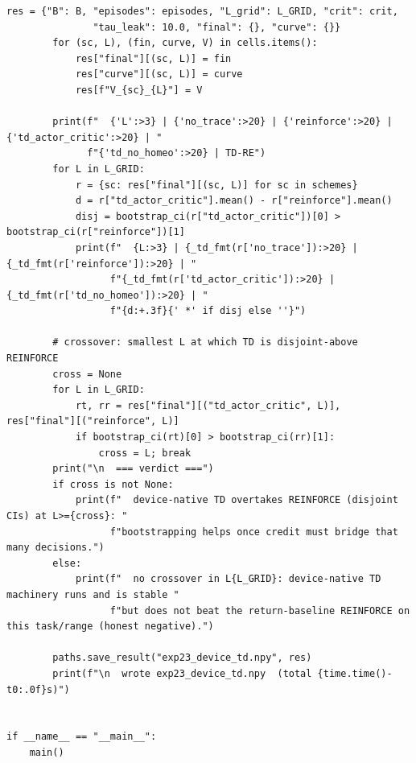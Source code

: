 \begin{lstlisting}[caption={mrl\_trace/extensions.py},label={lst:siox-src-extensions}]
        res = {"B": B, "episodes": episodes, "L_grid": L_GRID, "crit": crit,
               "tau_leak": 10.0, "final": {}, "curve": {}}
        for (sc, L), (fin, curve, V) in cells.items():
            res["final"][(sc, L)] = fin
            res["curve"][(sc, L)] = curve
            res[f"V_{sc}_{L}"] = V

        print(f"  {'L':>3} | {'no_trace':>20} | {'reinforce':>20} | {'td_actor_critic':>20} | "
              f"{'td_no_homeo':>20} | TD-RE")
        for L in L_GRID:
            r = {sc: res["final"][(sc, L)] for sc in schemes}
            d = r["td_actor_critic"].mean() - r["reinforce"].mean()
            disj = bootstrap_ci(r["td_actor_critic"])[0] > bootstrap_ci(r["reinforce"])[1]
            print(f"  {L:>3} | {_td_fmt(r['no_trace']):>20} | {_td_fmt(r['reinforce']):>20} | "
                  f"{_td_fmt(r['td_actor_critic']):>20} | {_td_fmt(r['td_no_homeo']):>20} | "
                  f"{d:+.3f}{' *' if disj else ''}")

        # crossover: smallest L at which TD is disjoint-above REINFORCE
        cross = None
        for L in L_GRID:
            rt, rr = res["final"][("td_actor_critic", L)], res["final"][("reinforce", L)]
            if bootstrap_ci(rt)[0] > bootstrap_ci(rr)[1]:
                cross = L; break
        print("\n  === verdict ===")
        if cross is not None:
            print(f"  device-native TD overtakes REINFORCE (disjoint CIs) at L>={cross}: "
                  f"bootstrapping helps once credit must bridge that many decisions.")
        else:
            print(f"  no crossover in L{L_GRID}: device-native TD machinery runs and is stable "
                  f"but does not beat the return-baseline REINFORCE on this task/range (honest negative).")

        paths.save_result("exp23_device_td.npy", res)
        print(f"\n  wrote exp23_device_td.npy  (total {time.time()-t0:.0f}s)")


if __name__ == "__main__":
    main()
\end{lstlisting}

